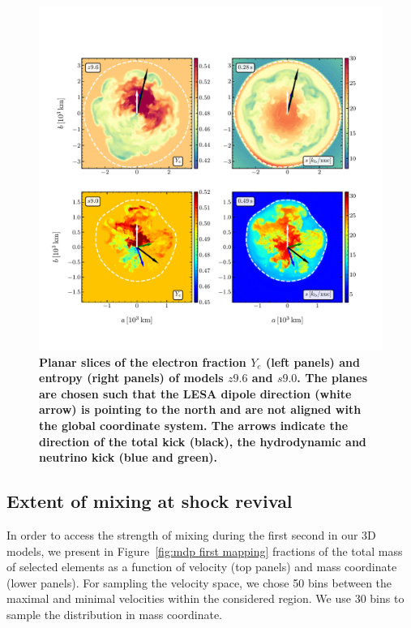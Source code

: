 \documentclass[fleqn,usenatbib]{mnras}
\begin{document}
\begin{figure}
 \centering
 \includegraphics[width=\textwidth,trim=0cm 1.3cm 0cm 2cm,clip]{pic/z9_s9_3d_ye_sto_kick_slices_paper.pdf}
 \caption{\textbf{Planar slices of the electron fraction $Y_{e}$ (left panels) and entropy (right panels) of models $z9.6$ and $s9.0$. The planes are chosen such that the LESA dipole direction (white arrow) is pointing to the north and are not aligned with the global coordinate system. The arrows indicate the direction of the total kick (black), the hydrodynamic and neutrino kick (blue and green).}}
 \label{fig:sto ye s9 z9 kick}
\end{figure}

\subsection{Extent of mixing at shock revival}
\label{sec:Extent of mixing at shock revival}

In order to access the strength of mixing during the first second in our 3D models, we present in Figure~\ref{fig:mdp first mapping} fractions of the total mass of selected elements as a function of velocity (top panels) and mass coordinate (lower panels). 
For sampling the velocity space, we chose 50 bins between the maximal and minimal velocities within the considered region. We use 30 bins to sample the distribution in mass coordinate.
\end{document}
